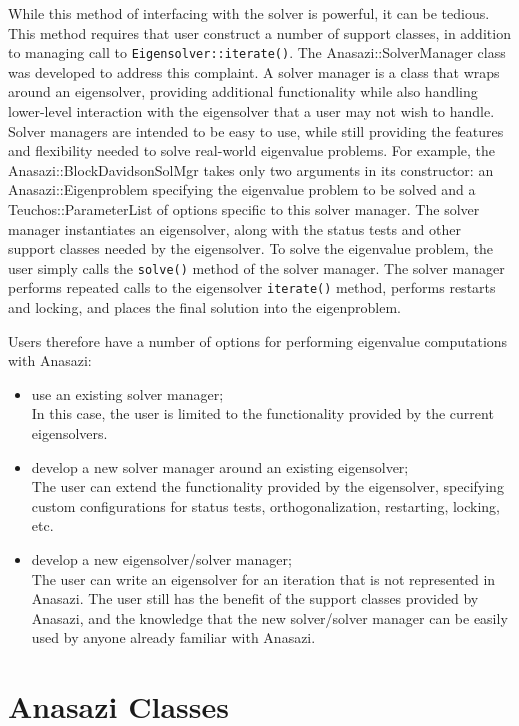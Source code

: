 While this method of interfacing with the solver is powerful, it can be tedious.
This method requires that user construct a number of support classes, in addition to
managing call to \verb!Eigensolver::iterate()!.
The Anasazi::SolverManager class was developed to
address this complaint. A solver manager is a class that wraps around an eigensolver,
providing additional functionality while also handling lower-level interaction with the
eigensolver that a user may not wish to handle. Solver managers are intended to be 
easy to use, while still providing the features and flexibility needed to solve real-world
eigenvalue problems. For example, the Anasazi::BlockDavidsonSolMgr takes only two
arguments in its constructor: an Anasazi::Eigenproblem specifying the eigenvalue problem
to be solved and a Teuchos::ParameterList of options specific to this solver manager. The
solver manager instantiates an eigensolver, along with the status tests and other support
classes needed by the eigensolver. To solve the eigenvalue problem, the user simply calls
the \verb!solve()! method of the solver manager. The solver manager performs repeated
calls to the eigensolver \verb!iterate()! method, performs restarts and locking, and
places the final solution into the eigenproblem.

Users therefore have a number of options for performing eigenvalue computations with Anasazi:
\begin{itemize}
  \item use an existing solver manager;\\
        In this case, the user is limited to the functionality provided by the current eigensolvers.
  \item develop a new solver manager around an existing eigensolver;\\
        The user can extend the functionality provided by the eigensolver, specifying 
        custom configurations for status tests, orthogonalization, restarting, locking,
        etc.
  \item develop a new eigensolver/solver manager;\\
        The user can write an eigensolver for an iteration that is not represented in
        Anasazi. The user still has the benefit of the support classes provided by 
        Anasazi, and the knowledge that the new solver/solver manager can be easily
        used by anyone already familiar with Anasazi.
\end{itemize}


\section{Anasazi Classes}
\label{sec:anasazi:classes}

